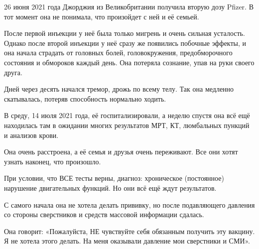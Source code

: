 26 июня 2021 года Джорджия из Великобритании получила вторую дозу Pfizer. В тот
момент она не понимала, что произойдет с ней и её семьей.

После первой инъекции у неё была только мигрень и очень сильная
усталость. Однако после второй инъекции у неё сразу же появились побочные
эффекты, и она начала страдать от головных болей, головокружения,
предобморочного состояния и обмороков каждый день. Она потеряла сознание, упав
на руки своего друга.

Дней через десять начался тремор, дрожь по всему телу. Так она медленно
скатывалась, потеряв способность нормально ходить.

В среду, 14 июля 2021 года, её госпитализировали, а неделю спустя она всё ещё
находилась там в ожидании многих результатов МРТ, КТ, люмбальных пункций и
анализов крови.

Она очень расстроена, а её семья и друзья очень переживают. Все они хотят узнать
наконец, что произошло.

При условии, что ВСЕ тесты верны, диагноз: хроническое (постоянное) нарушение
двигательных функций. Но они всё ещё ждут результатов.

С самого начала она не хотела делать прививку, но после подавляющего давления со
стороны сверстников и средств массовой информации сдалась.

Она говорит: «Пожалуйста, НЕ чувствуйте себя обязанным получить эту вакцину. Я
не хотела этого делать. На меня оказывали давление мои сверстники и СМИ».
